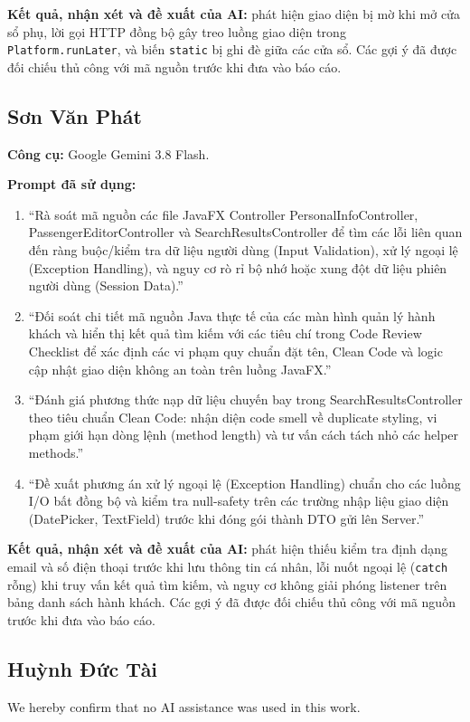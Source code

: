 \documentclass[12pt,a4paper]{article}
\begin{document}
\noindent\textbf{Kết quả, nhận xét và đề xuất của AI:} phát hiện giao diện bị mờ khi mở cửa sổ phụ, lời gọi HTTP đồng bộ gây treo luồng giao diện trong \texttt{Platform.runLater}, và biến \texttt{static} bị ghi đè giữa các cửa sổ. Các gợi ý đã được đối chiếu thủ công với mã nguồn trước khi đưa vào báo cáo.

\subsection{Sơn Văn Phát}
\textbf{Công cụ:} Google Gemini 3.8 Flash.

\noindent\textbf{Prompt đã sử dụng:}
\begin{enumerate}[noitemsep]
  \item ``Rà soát mã nguồn các file JavaFX Controller PersonalInfoController, PassengerEditorController và SearchResultsController để tìm các lỗi liên quan đến ràng buộc/kiểm tra dữ liệu người dùng (Input Validation), xử lý ngoại lệ (Exception Handling), và nguy cơ rò rỉ bộ nhớ hoặc xung đột dữ liệu phiên người dùng (Session Data).''
  \item ``Đối soát chi tiết mã nguồn Java thực tế của các màn hình quản lý hành khách và hiển thị kết quả tìm kiếm với các tiêu chí trong Code Review Checklist để xác định các vi phạm quy chuẩn đặt tên, Clean Code và logic cập nhật giao diện không an toàn trên luồng JavaFX.''
  \item ``Đánh giá phương thức nạp dữ liệu chuyến bay trong SearchResultsController theo tiêu chuẩn Clean Code: nhận diện code smell về duplicate styling, vi phạm giới hạn dòng lệnh (method length) và tư vấn cách tách nhỏ các helper methods.''
  \item ``Đề xuất phương án xử lý ngoại lệ (Exception Handling) chuẩn cho các luồng I/O bất đồng bộ và kiểm tra null-safety trên các trường nhập liệu giao diện (DatePicker, TextField) trước khi đóng gói thành DTO gửi lên Server.''
\end{enumerate}

\noindent\textbf{Kết quả, nhận xét và đề xuất của AI:} phát hiện thiếu kiểm tra định dạng email và số điện thoại trước khi lưu thông tin cá nhân, lỗi nuốt ngoại lệ (\texttt{catch} rỗng) khi truy vấn kết quả tìm kiếm, và nguy cơ không giải phóng listener trên bảng danh sách hành khách. Các gợi ý đã được đối chiếu thủ công với mã nguồn trước khi đưa vào báo cáo.

\subsection{Huỳnh Đức Tài}
We hereby confirm that no AI assistance was used in this work.
\end{document}

